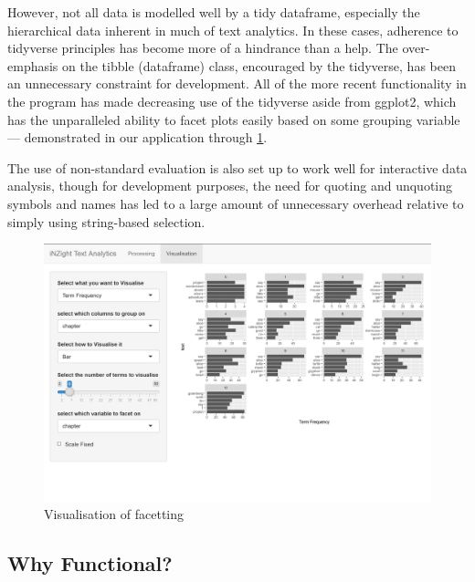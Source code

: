\documentclass[11pt, a4paper, titlepage]{report}
\begin{document}
However, not all data is modelled well by a tidy dataframe, especially
the hierarchical data inherent in much of text analytics. In these
cases, adherence to tidyverse principles has become more of a
hindrance than a help. The over-emphasis on the tibble (dataframe)
class, encouraged by the tidyverse, has been an unnecessary constraint
for development. All of the more recent functionality in the program
has made decreasing use of the tidyverse aside from ggplot2, which has
the unparalleled ability to facet plots easily based on some grouping
variable --- demonstrated in our application through
\underline{\cref{fig:visualisation-facetting}}.

The use of non-standard evaluation is also set up to work well for
interactive data analysis, though for development purposes, the need
for quoting and unquoting symbols and names has led to a large amount
of unnecessary overhead relative to simply using string-based
selection.

\begin{figure}
  \centering \includegraphics[scale=0.35]{visualisation-facetting.png}
  \caption{Visualisation of
    facetting\label{fig:visualisation-facetting}}
\end{figure}

\subsection{Why Functional?}\label{sec:why-functional}
\end{document}
